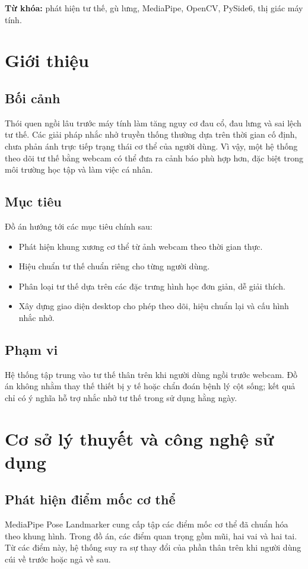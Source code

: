 \documentclass[12pt,a4paper,oneside]{report}
\begin{document}
\textbf{Từ khóa:} phát hiện tư thế, gù lưng, MediaPipe, OpenCV, PySide6, thị giác máy tính.

\tableofcontents

\chapter{Giới thiệu}

\section{Bối cảnh}
Thói quen ngồi lâu trước máy tính làm tăng nguy cơ đau cổ, đau lưng và sai lệch tư thế. Các giải pháp nhắc nhở truyền thống thường dựa trên thời gian cố định, chưa phản ánh trực tiếp trạng thái cơ thể của người dùng. Vì vậy, một hệ thống theo dõi tư thế bằng webcam có thể đưa ra cảnh báo phù hợp hơn, đặc biệt trong môi trường học tập và làm việc cá nhân.

\section{Mục tiêu}
Đồ án hướng tới các mục tiêu chính sau:
\begin{itemize}[leftmargin=1.2cm]
    \item Phát hiện khung xương cơ thể từ ảnh webcam theo thời gian thực.
    \item Hiệu chuẩn tư thế chuẩn riêng cho từng người dùng.
    \item Phân loại tư thế dựa trên các đặc trưng hình học đơn giản, dễ giải thích.
    \item Xây dựng giao diện desktop cho phép theo dõi, hiệu chuẩn lại và cấu hình nhắc nhở.
\end{itemize}

\section{Phạm vi}
Hệ thống tập trung vào tư thế thân trên khi người dùng ngồi trước webcam. Đồ án không nhằm thay thế thiết bị y tế hoặc chẩn đoán bệnh lý cột sống; kết quả chỉ có ý nghĩa hỗ trợ nhắc nhở tư thế trong sử dụng hằng ngày.

\chapter{Cơ sở lý thuyết và công nghệ sử dụng}

\section{Phát hiện điểm mốc cơ thể}
MediaPipe Pose Landmarker cung cấp tập các điểm mốc cơ thể đã chuẩn hóa theo khung hình. Trong đồ án, các điểm quan trọng gồm mũi, hai vai và hai tai. Từ các điểm này, hệ thống suy ra sự thay đổi của phần thân trên khi người dùng cúi về trước hoặc ngả về sau.
\end{document}
